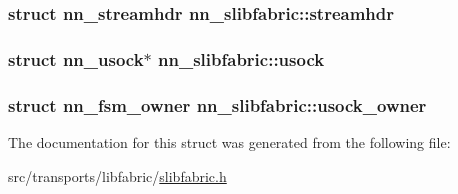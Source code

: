 \subsubsection[{streamhdr}]{\setlength{\rightskip}{0pt plus 5cm}struct {\bf nn\+\_\+streamhdr} nn\+\_\+slibfabric\+::streamhdr}\hypertarget{structnn__slibfabric_a46abae8e6f3b15f833bccd0e3f127496}{}\label{structnn__slibfabric_a46abae8e6f3b15f833bccd0e3f127496}
\subsubsection[{usock}]{\setlength{\rightskip}{0pt plus 5cm}struct {\bf nn\+\_\+usock}$\ast$ nn\+\_\+slibfabric\+::usock}\hypertarget{structnn__slibfabric_a5208cceb46c2f7a8d1854850aa536739}{}\label{structnn__slibfabric_a5208cceb46c2f7a8d1854850aa536739}
\subsubsection[{usock\+\_\+owner}]{\setlength{\rightskip}{0pt plus 5cm}struct {\bf nn\+\_\+fsm\+\_\+owner} nn\+\_\+slibfabric\+::usock\+\_\+owner}\hypertarget{structnn__slibfabric_ad264fc1b912488e4df1030020ee30b53}{}\label{structnn__slibfabric_ad264fc1b912488e4df1030020ee30b53}


The documentation for this struct was generated from the following file\+:\begin{DoxyCompactItemize}
\item 
src/transports/libfabric/\hyperlink{slibfabric_8h}{slibfabric.\+h}\end{DoxyCompactItemize}
